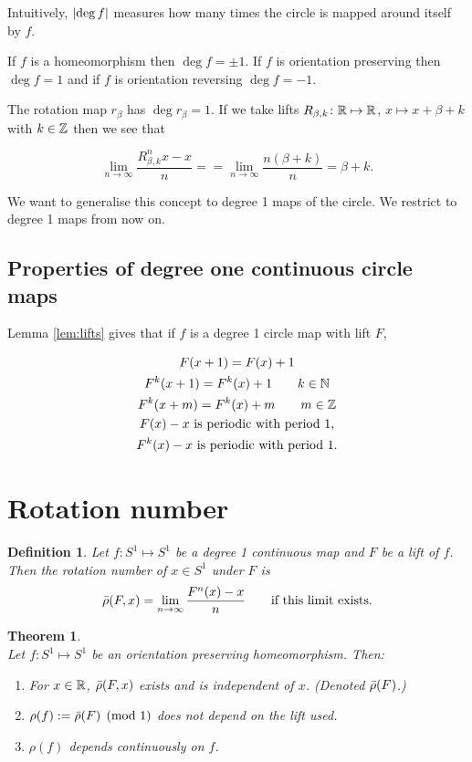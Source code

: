 \documentclass{notes}
\theoremstyle{plain}
\newtheorem{theorem}[proposition]{Theorem}
\newtheorem{definition}[proposition]{Definition}
\begin{document}
Intuitively, $\left|\deg f\right|$ measures how many times the circle is
mapped around itself by $f$.

If $f$ is a homeomorphism then $\deg f = \pm 1$.  If $f$ is orientation
preserving then $\deg f = 1$ and if $f$ is orientation reversing
$\deg f = -1$.

The rotation map $r_\beta$ has $\deg r_\beta = 1$.  If we take lifts
$R_{\beta,k} \colon \mathbb{R} \mapsto \mathbb{R}$, $x \mapsto x + \beta + k$ with
$k \in \mathbb{Z}$ then we see that

\[
\lim_{n \to \infty} \frac{R^n_{\beta,k} x - x}{n} =
=\lim_{n \to \infty} \frac{n (\beta + k)}{n} = \beta + k.
\]

We want to generalise this concept to degree 1 maps of the circle.
We restrict to degree 1 maps from now on.

\subsection[Degree one circle maps]%
{Properties of degree one continuous circle maps}

Lemma \ref{lem:lifts} gives that if $f$ is a degree 1 circle map with
lift $F$,

\begin{equation}\label{eq:degoneprop}
\begin{gathered}
F(x+1) = F(x) + 1 \\
F^k(x+1) = F^k(x) + 1 \qquad k \in \mathbb{N} \\
F^k(x+m) = F^k(x) + m \qquad m \in \mathbb{Z} \\
F(x) - x \text{ is periodic with period 1,} \\
F^k(x) - x \text{ is periodic with period 1.}
\end{gathered}
\end{equation}

\section{Rotation number}

\begin{definition}
Let $f \colon S^1 \mapsto S^1$ be a degree 1 continuous map and
$F$ be a lift of $f$.  Then the rotation number of $x \in S^1$ under $F$
is
\[
\Bar{\rho}(F,x) = \lim_{n \to \infty} \frac{F^n(x) - x}{n}
\qquad \text{if this limit exists.}
\]
\end{definition}

\begin{theorem}\label{thm:rotoph}\hfill\\
Let $f \colon S^1 \mapsto S^1$ be an orientation preserving homeomorphism.
Then:

\begin{enumerate}
\item For $x \in \mathbb{R}$, $\Bar{\rho}(F,x)$ exists and is independent of
$x$.  (Denoted $\Bar{\rho}(F)$.)
\item $\rho(f) := \Bar{\rho}(F) \pmod{1}$ does not depend on the lift
used.
\item $\rho(f)$ depends continuously on $f$.
\end{enumerate}
\end{theorem}
\end{document}

